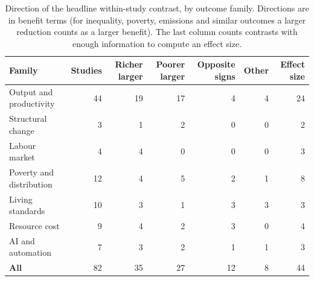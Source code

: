 \begin{table}[ht]\centering\small
\caption{Direction of the headline within-study contrast, by outcome family. Directions are in benefit terms (for inequality, poverty, emissions and similar outcomes a larger reduction counts as a larger benefit). The last column counts contrasts with enough information to compute an effect size.}\label{tab:cdirs}
\begin{tabular}{@{}lrrrrrr@{}}\toprule Family & Studies & Richer larger & Poorer larger & Opposite signs & Other & Effect size\\\midrule
Output and productivity & 44 & 19 & 17 & 4 & 4 & 24\\
Structural change & 3 & 1 & 2 & 0 & 0 & 2\\
Labour market & 4 & 4 & 0 & 0 & 0 & 3\\
Poverty and distribution & 12 & 4 & 5 & 2 & 1 & 8\\
Living standards & 10 & 3 & 1 & 3 & 3 & 3\\
Resource cost & 9 & 4 & 2 & 3 & 0 & 4\\
\midrule AI and automation & 7 & 3 & 2 & 1 & 1 & 3\\
\textbf{All} & 82 & 35 & 27 & 12 & 8 & 44\\
\bottomrule\end{tabular}\end{table}

